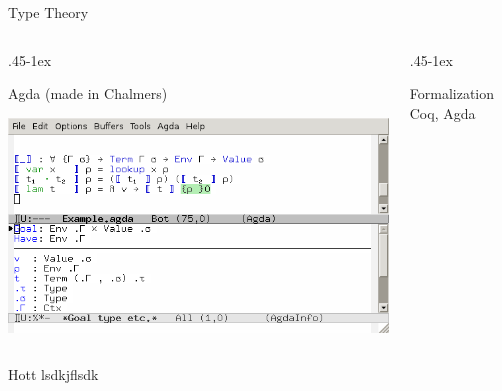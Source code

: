\documentclass[final]{beamer}
\begin{document}
\begin{frame}
\begin{block}{Type Theory}
\begin{columns}
\begin{column}{.45\textwidth-1ex}
\begin{block}{Agda \hfill {\small (made in Chalmers)}}
          \begin{minipage}{.45\textwidth-1ex}
            \includegraphics[scale=1.2]{emacs.png}
          \end{minipage}
        \end{block}

      \end{column}
      \begin{column}{.45\textwidth-1ex}%
        \begin{block}{Formalization}
          Coq, Agda
        \end{block}

      \end{column}
    \end{columns}

    \begin{block}{Hott}
      lsdkjflsdk
    \end{block}

  \end{block}
\end{frame}
\end{document}
